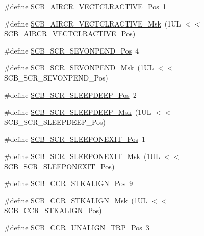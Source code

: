 \begin{DoxyCompactItemize}
\item 
\#define \hyperlink{group___c_m_s_i_s___s_c_b_gaa30a12e892bb696e61626d71359a9029}{S\+C\+B\+\_\+\+A\+I\+R\+C\+R\+\_\+\+V\+E\+C\+T\+C\+L\+R\+A\+C\+T\+I\+V\+E\+\_\+\+Pos}~1
\item 
\#define \hyperlink{group___c_m_s_i_s___s_c_b_ga212c5ab1c1c82c807d30d2307aa8d218}{S\+C\+B\+\_\+\+A\+I\+R\+C\+R\+\_\+\+V\+E\+C\+T\+C\+L\+R\+A\+C\+T\+I\+V\+E\+\_\+\+Msk}~(1\+U\+L $<$$<$ S\+C\+B\+\_\+\+A\+I\+R\+C\+R\+\_\+\+V\+E\+C\+T\+C\+L\+R\+A\+C\+T\+I\+V\+E\+\_\+\+Pos)
\item 
\#define \hyperlink{group___c_m_s_i_s___s_c_b_ga3bddcec40aeaf3d3a998446100fa0e44}{S\+C\+B\+\_\+\+S\+C\+R\+\_\+\+S\+E\+V\+O\+N\+P\+E\+N\+D\+\_\+\+Pos}~4
\item 
\#define \hyperlink{group___c_m_s_i_s___s_c_b_gafb98656644a14342e467505f69a997c9}{S\+C\+B\+\_\+\+S\+C\+R\+\_\+\+S\+E\+V\+O\+N\+P\+E\+N\+D\+\_\+\+Msk}~(1\+U\+L $<$$<$ S\+C\+B\+\_\+\+S\+C\+R\+\_\+\+S\+E\+V\+O\+N\+P\+E\+N\+D\+\_\+\+Pos)
\item 
\#define \hyperlink{group___c_m_s_i_s___s_c_b_gab304f6258ec03bd9a6e7a360515c3cfe}{S\+C\+B\+\_\+\+S\+C\+R\+\_\+\+S\+L\+E\+E\+P\+D\+E\+E\+P\+\_\+\+Pos}~2
\item 
\#define \hyperlink{group___c_m_s_i_s___s_c_b_ga77c06a69c63f4b3f6ec1032e911e18e7}{S\+C\+B\+\_\+\+S\+C\+R\+\_\+\+S\+L\+E\+E\+P\+D\+E\+E\+P\+\_\+\+Msk}~(1\+U\+L $<$$<$ S\+C\+B\+\_\+\+S\+C\+R\+\_\+\+S\+L\+E\+E\+P\+D\+E\+E\+P\+\_\+\+Pos)
\item 
\#define \hyperlink{group___c_m_s_i_s___s_c_b_ga3680a15114d7fdc1e25043b881308fe9}{S\+C\+B\+\_\+\+S\+C\+R\+\_\+\+S\+L\+E\+E\+P\+O\+N\+E\+X\+I\+T\+\_\+\+Pos}~1
\item 
\#define \hyperlink{group___c_m_s_i_s___s_c_b_ga50a243e317b9a70781b02758d45b05ee}{S\+C\+B\+\_\+\+S\+C\+R\+\_\+\+S\+L\+E\+E\+P\+O\+N\+E\+X\+I\+T\+\_\+\+Msk}~(1\+U\+L $<$$<$ S\+C\+B\+\_\+\+S\+C\+R\+\_\+\+S\+L\+E\+E\+P\+O\+N\+E\+X\+I\+T\+\_\+\+Pos)
\item 
\#define \hyperlink{group___c_m_s_i_s___s_c_b_gac2d20a250960a432cc74da59d20e2f86}{S\+C\+B\+\_\+\+C\+C\+R\+\_\+\+S\+T\+K\+A\+L\+I\+G\+N\+\_\+\+Pos}~9
\item 
\#define \hyperlink{group___c_m_s_i_s___s_c_b_ga33cf22d3d46af158a03aad25ddea1bcb}{S\+C\+B\+\_\+\+C\+C\+R\+\_\+\+S\+T\+K\+A\+L\+I\+G\+N\+\_\+\+Msk}~(1\+U\+L $<$$<$ S\+C\+B\+\_\+\+C\+C\+R\+\_\+\+S\+T\+K\+A\+L\+I\+G\+N\+\_\+\+Pos)
\item 
\#define \hyperlink{group___c_m_s_i_s___s_c_b_gac4e4928b864ea10fc24dbbc57d976229}{S\+C\+B\+\_\+\+C\+C\+R\+\_\+\+U\+N\+A\+L\+I\+G\+N\+\_\+\+T\+R\+P\+\_\+\+Pos}~3
$$
\end{DoxyCompactItemize}
